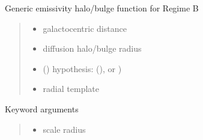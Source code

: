 \documentclass[letterpaper,10pt,english]{sphinxmanual}
\begin{document}

\begin{fulllineitems}
\label{\detokenize{diffsph.profiles:diffsph.profiles.hfactors.Hem_B}}
\pysigstartsignatures
{}
\pysigstopsignatures
\sphinxAtStartPar
Generic emissivity halo/bulge function for Regime B
\begin{quote}\begin{description}
\begin{itemize}
\item {} 
\sphinxAtStartPar
{} \textendash{} galactocentric distance

\item {} 
\sphinxAtStartPar
{} \textendash{} diffusion halo/bulge radius

\item {} 
\sphinxAtStartPar
{} () \textendash{} hypothesis:  (),  or )

\item {} 
\sphinxAtStartPar
{} \textendash{} radial template

\end{itemize}

\end{description}\end{quote}

\sphinxAtStartPar
Keyword arguments
\begin{quote}\begin{description}
\begin{itemize}
\item {} 
\sphinxAtStartPar
{} \textendash{} scale radius


\end{itemize}
\end{description}
\end{quote}
\end{fulllineitems}
\end{document}
